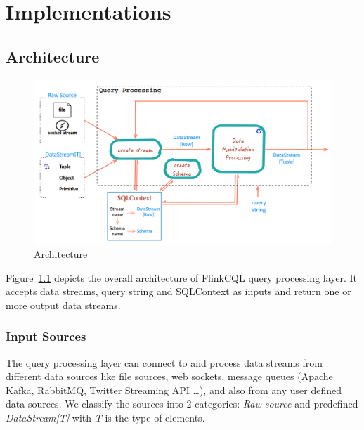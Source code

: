 
\chapter{Implementations}

\ifpdf
    \graphicspath{{Chapter5/Figs/Raster/}{Chapter5/Figs/PDF/}{Chapter5/Figs/}}
\else
    \graphicspath{{Chapter5/Figs/Vector/}{Chapter5/Figs/}}
\fi

\section{Architecture}

\begin{figure}[h!] 
\centering    
\includegraphics[width=1\textwidth]{Architecture}
\caption{Architecture}
\label{fig:Architecture}
\end{figure}


Figure~\ref{fig:Architecture} depicts the overall architecture of FlinkCQL query processing layer. It accepts data streams, query string and SQLContext as inputs and return one or more output data streams.
\subsection{Input Sources}
The query processing layer can connect to and process data streams from different data sources like file sources, web sockets, message queues (Apache Kafka, RabbitMQ, Twitter Streaming API …), and also from any user defined data sources. We classify the sources into 2 categories: \textit{Raw source} and predefined \textit{DataStream[T]} with \textit{T} is the type of elements.

